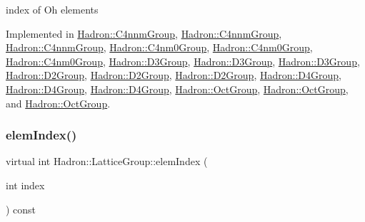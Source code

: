 index of Oh elements 

Implemented in \mbox{\hyperlink{structHadron_1_1C4nnmGroup_a8cbcb161ddf801e759797f231db35f75}{Hadron\+::\+C4nnm\+Group}}, \mbox{\hyperlink{structHadron_1_1C4nnmGroup_a8cbcb161ddf801e759797f231db35f75}{Hadron\+::\+C4nnm\+Group}}, \mbox{\hyperlink{structHadron_1_1C4nnmGroup_a8cbcb161ddf801e759797f231db35f75}{Hadron\+::\+C4nnm\+Group}}, \mbox{\hyperlink{structHadron_1_1C4nm0Group_a700a48f1865a634b774127d8710e1ecc}{Hadron\+::\+C4nm0\+Group}}, \mbox{\hyperlink{structHadron_1_1C4nm0Group_a700a48f1865a634b774127d8710e1ecc}{Hadron\+::\+C4nm0\+Group}}, \mbox{\hyperlink{structHadron_1_1C4nm0Group_a700a48f1865a634b774127d8710e1ecc}{Hadron\+::\+C4nm0\+Group}}, \mbox{\hyperlink{structHadron_1_1D3Group_a90ac88df35dd8e919637917dc22ee903}{Hadron\+::\+D3\+Group}}, \mbox{\hyperlink{structHadron_1_1D3Group_a90ac88df35dd8e919637917dc22ee903}{Hadron\+::\+D3\+Group}}, \mbox{\hyperlink{structHadron_1_1D3Group_a90ac88df35dd8e919637917dc22ee903}{Hadron\+::\+D3\+Group}}, \mbox{\hyperlink{structHadron_1_1D2Group_aa7676a51e002eb654648c4d84585d6da}{Hadron\+::\+D2\+Group}}, \mbox{\hyperlink{structHadron_1_1D2Group_aa7676a51e002eb654648c4d84585d6da}{Hadron\+::\+D2\+Group}}, \mbox{\hyperlink{structHadron_1_1D2Group_aa7676a51e002eb654648c4d84585d6da}{Hadron\+::\+D2\+Group}}, \mbox{\hyperlink{structHadron_1_1D4Group_aa4ca8a3f1bc6774b630cd6a354179298}{Hadron\+::\+D4\+Group}}, \mbox{\hyperlink{structHadron_1_1D4Group_aa4ca8a3f1bc6774b630cd6a354179298}{Hadron\+::\+D4\+Group}}, \mbox{\hyperlink{structHadron_1_1D4Group_aa4ca8a3f1bc6774b630cd6a354179298}{Hadron\+::\+D4\+Group}}, \mbox{\hyperlink{structHadron_1_1OctGroup_a1410a74894e1d12337548245c4e6fd47}{Hadron\+::\+Oct\+Group}}, \mbox{\hyperlink{structHadron_1_1OctGroup_a1410a74894e1d12337548245c4e6fd47}{Hadron\+::\+Oct\+Group}}, and \mbox{\hyperlink{structHadron_1_1OctGroup_a1410a74894e1d12337548245c4e6fd47}{Hadron\+::\+Oct\+Group}}.

\mbox{\label{structHadron_1_1LatticeGroup_afb8e3ee60de059f75bce1044c694e1e8}} 
\subsubsection{\texorpdfstring{elemIndex()}{elemIndex()}\hspace{0.1cm}{\footnotesize\ttfamily [2/3]}}
{\footnotesize\ttfamily virtual int Hadron\+::\+Lattice\+Group\+::elem\+Index (\begin{DoxyParamCaption}\item[{int}]{index }\end{DoxyParamCaption}) const\hspace{0.3cm}{\ttfamily [pure virtual]}}

